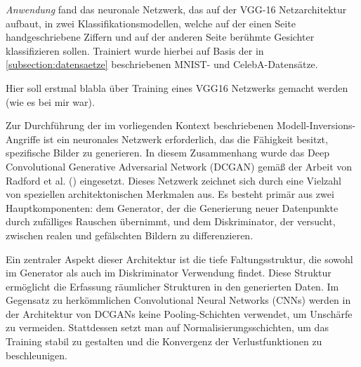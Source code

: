 \textit{Anwendung} fand das neuronale Netzwerk, das auf der VGG-16 Netzarchitektur aufbaut, in zwei Klassifikationsmodellen, welche auf der einen Seite handgeschriebene Ziffern und auf der anderen Seite berühmte Gesichter klassifizieren sollen. Trainiert wurde hierbei auf Basis der in \ref{subsection:datensaetze} beschriebenen MNIST- und CelebA-Datensätze.


\begin{table}[h]
	\centering
	\renewcommand{\arraystretch}{1.5}
	\caption{Hyperparameter des \glqq normalen\grqq{} Trainings bezüglich der angegebenen Datensätze}
	\label{tab:nn_train}
\end{table}

Hier soll erstmal blabla über Training eines VGG16 Netzwerks gemacht werden (wie es bei mir war).

Zur Durchführung der im vorliegenden Kontext beschriebenen Modell-Inversions-Angriffe ist ein neuronales Netzwerk erforderlich, das die Fähigkeit besitzt, spezifische Bilder zu generieren. In diesem Zusammenhang wurde das Deep Convolutional Generative Adversarial Network (DCGAN) gemäß der Arbeit von Radford et al. (\cite{radford_unsupervised_2016}) eingesetzt. Dieses Netzwerk zeichnet sich durch eine Vielzahl von speziellen architektonischen Merkmalen aus. Es besteht primär aus zwei Hauptkomponenten: dem Generator, der die Generierung neuer Datenpunkte durch zufälliges Rauschen übernimmt, und dem Diskriminator, der versucht, zwischen realen und gefälschten Bildern zu differenzieren.

Ein zentraler Aspekt dieser Architektur ist die tiefe Faltungsstruktur, die sowohl im Generator als auch im Diskriminator Verwendung findet. Diese Struktur ermöglicht die Erfassung räumlicher Strukturen in den generierten Daten. Im Gegensatz zu herkömmlichen Convolutional Neural Networks (CNNs) werden in der Architektur von DCGANs keine Pooling-Schichten verwendet, um Unschärfe zu vermeiden. Stattdessen setzt man auf Normalisierungsschichten, um das Training stabil zu gestalten und die Konvergenz der Verlustfunktionen zu beschleunigen.


